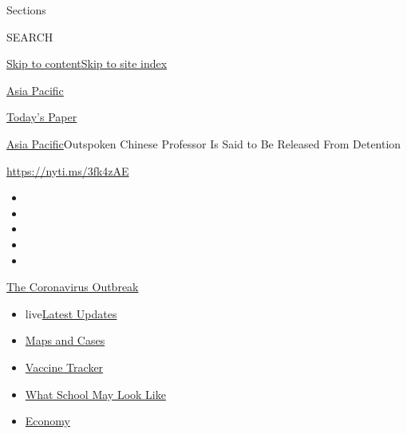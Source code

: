 Sections

SEARCH

\protect\hyperlink{site-content}{Skip to
content}\protect\hyperlink{site-index}{Skip to site index}

\href{https://www.nytimes3xbfgragh.onion/section/world/asia}{Asia
Pacific}

\href{https://myaccount.nytimes3xbfgragh.onion/auth/login?response_type=cookie\&client_id=vi}{}

\href{https://www.nytimes3xbfgragh.onion/section/todayspaper}{Today's
Paper}

\href{/section/world/asia}{Asia Pacific}\textbar{}Outspoken Chinese
Professor Is Said to Be Released From Detention

\url{https://nyti.ms/3fk4zAE}

\begin{itemize}
\item
\item
\item
\item
\item
\end{itemize}

\href{https://www.nytimes3xbfgragh.onion/news-event/coronavirus?action=click\&pgtype=Article\&state=default\&region=TOP_BANNER\&context=storylines_menu}{The
Coronavirus Outbreak}

\begin{itemize}
\tightlist
\item
  live\href{https://www.nytimes3xbfgragh.onion/2020/08/02/world/coronavirus-updates.html?action=click\&pgtype=Article\&state=default\&region=TOP_BANNER\&context=storylines_menu}{Latest
  Updates}
\item
  \href{https://www.nytimes3xbfgragh.onion/interactive/2020/us/coronavirus-us-cases.html?action=click\&pgtype=Article\&state=default\&region=TOP_BANNER\&context=storylines_menu}{Maps
  and Cases}
\item
  \href{https://www.nytimes3xbfgragh.onion/interactive/2020/science/coronavirus-vaccine-tracker.html?action=click\&pgtype=Article\&state=default\&region=TOP_BANNER\&context=storylines_menu}{Vaccine
  Tracker}
\item
  \href{https://www.nytimes3xbfgragh.onion/interactive/2020/07/29/us/schools-reopening-coronavirus.html?action=click\&pgtype=Article\&state=default\&region=TOP_BANNER\&context=storylines_menu}{What
  School May Look Like}
\item
  \href{https://www.nytimes3xbfgragh.onion/live/2020/07/31/business/stock-market-today-coronavirus?action=click\&pgtype=Article\&state=default\&region=TOP_BANNER\&context=storylines_menu}{Economy}
\end{itemize}

